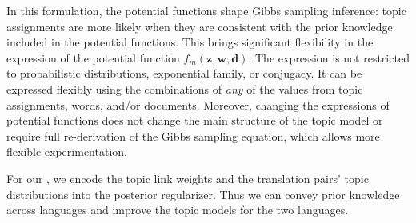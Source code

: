 In this formulation, the potential functions shape Gibbs sampling
inference: topic assignments are more likely when they are consistent
with the prior knowledge included in the potential functions.
This brings significant flexibility in the expression of the potential
function $f_m (\bm{z}, \bm{w}, \bm{d})$.
The expression is not restricted to probabilistic distributions,
exponential family, or conjugacy.  
It can be expressed flexibly using the combinations of \emph{any} of
the values from topic assignments, words, and/or documents. 
Moreover, changing the expressions of potential functions does not
change the main structure of the topic model or require full
re-derivation of the Gibbs sampling equation, which allows more
flexible experimentation.

For our \mtm, we encode the topic link weights and the translation
pairs' topic distributions into the posterior regularizer. Thus we can
convey prior knowledge across languages and improve the topic models
for the two languages.
